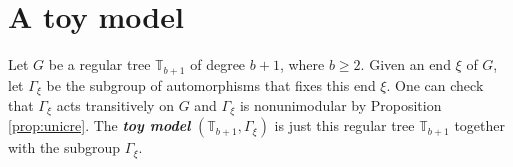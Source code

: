 \documentclass[12pt]{article}
\numberwithin{equation}{section}
\newcommand{\1}{\mathbf{1}}
\newcommand{\notion}[1]{{\bf  \textit{#1}}}
\begin{document}
 
 
 
 
 
 
 
 
 
 
 
 
 
 
 
 
 
 
 
 
 
 
 
 
 
 
 
 
 
 \section{A toy model}\label{sec: 3} %
 
 
 Let $G$ be a regular tree $\mathbb{T}_{b+1}$ of degree $b+1$, where $b\geq2$. Given an end $\xi$ of $G$, let $\Gamma_\xi$ be the subgroup of automorphisms that fixes this end $\xi$. One can check that $\Gamma_\xi$ acts transitively on $G$ and $\Gamma_\xi$ is nonunimodular by Proposition  \ref{prop:unicre}. The \notion{toy model} $(\mathbb{T}_{b+1}, \Gamma_{\xi})$ is just this regular tree $\mathbb{T}_{b+1}$ together with the subgroup $\Gamma_\xi$.
 
\end{document}
